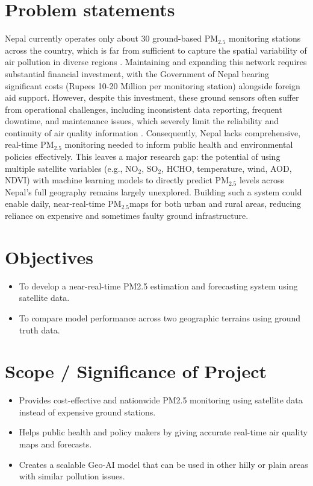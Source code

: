 \documentclass[12pt]{report}
\begin{document}
\section{Problem statements}

Nepal currently operates only about 30 ground-based PM$_{2.5}$ monitoring stations across the country, which is far from sufficient to capture the spatial variability of air pollution in diverse regions \cite{icimod2022station}. Maintaining and expanding this network requires substantial financial investment, with the Government of Nepal bearing significant costs (Rupees 10-20 Million per monitoring station) alongside foreign aid support. However, despite this investment, these ground sensors often suffer from operational challenges, including inconsistent data reporting, frequent downtime, and maintenance issues, which severely limit the reliability and continuity of air quality information \cite{annapurnaexpress23}. Consequently, Nepal lacks comprehensive, real-time PM$_{2.5}$ monitoring needed to inform public health and environmental policies effectively.
This leaves a major research gap: the potential of using multiple satellite variables (e.g., NO$_{2}$, SO$_{2}$, HCHO, temperature, wind, AOD, NDVI) with machine learning models to directly predict PM$_{2.5}$ levels across Nepal's full geography remains largely unexplored. Building such a system could enable daily, near-real-time PM$_{2.5}$maps for both urban and rural areas, reducing reliance on expensive and sometimes faulty ground infrastructure.


\section{Objectives}
\begin{itemize}
\item To develop a near-real-time PM2.5 estimation and forecasting system using satellite data.
\item To compare model performance across two geographic terrains using ground truth data.
\end{itemize}

\section{Scope / Significance of Project}

\begin{itemize}
    \item Provides cost-effective and nationwide PM2.5 monitoring using satellite data instead of expensive ground stations.
    \item Helps public health and policy makers by giving accurate real-time air quality maps and forecasts.
    \item Creates a scalable Geo-AI model that can be used in other hilly or plain areas with similar pollution issues.
\end{itemize}
\end{document}
